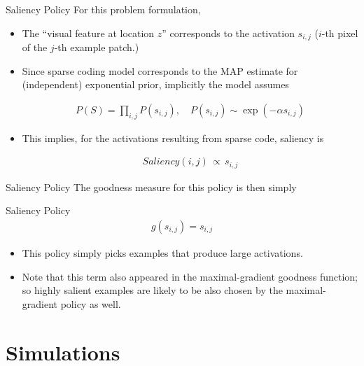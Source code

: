 \documentclass{beamer}
\begin{document}
\begin{frame}{Saliency Policy}
For this problem formulation,

\begin{itemize}
	\item The ``visual feature at location $z$'' corresponds to the activation $s_{i,j}$ ($i$-th pixel of the $j$-th example patch.)

	\item Since sparse coding model corresponds to the MAP estimate for (independent) exponential prior, implicitly the model assumes

\begin{align*}
P(S) = \prod_{i,j} P(s_{i,j}), \quad P(s_{i,j}) \sim \exp (-\alpha s_{i,j})
\end{align*}

	\item This implies, for the activations resulting from sparse code, saliency is

\begin{align*}
Saliency(i,j) \,\propto \, s_{i,j} 
\end{align*}
\end{itemize}
\end{frame}

\begin{frame}{Saliency Policy}
The goodness measure for this policy is then simply

\begin{beamerboxesrounded}[lower=lowyellow,upper=upyellow,shadow=true]{Saliency Policy}
\begin{align*}
g(s_{i, j}) = s_{i,j}
\end{align*}
\end{beamerboxesrounded}

\begin{itemize}
	\item This policy simply picks examples that produce large activations.
	\item Note that this term also appeared in the maximal-gradient goodness function; so highly salient examples are likely to be also chosen by the maximal-gradient policy as well.
\end{itemize}

\end{frame}

\section{Simulations}
\end{document}
